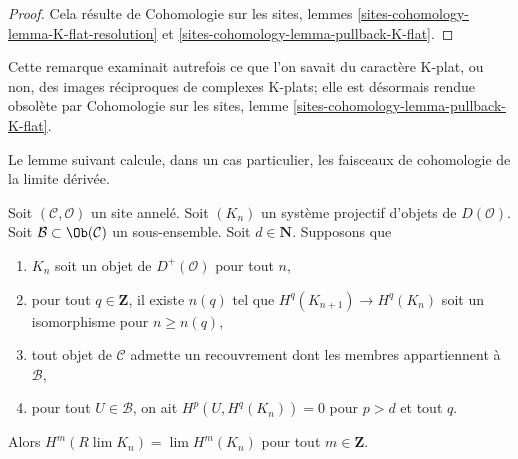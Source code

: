 \begin{proof}
Cela résulte de Cohomologie sur les sites, lemmes
\ref{sites-cohomology-lemma-K-flat-resolution} et
\ref{sites-cohomology-lemma-pullback-K-flat}.
\end{proof}

\begin{remark}
\label{remark-pullback-K-flat}
Cette remarque examinait autrefois ce que l'on savait du caractère K-plat,
ou non, des images réciproques de complexes K-plats; elle est désormais
rendue obsolète par Cohomologie sur les sites, lemme
\ref{sites-cohomology-lemma-pullback-K-flat}.
\end{remark}

\noindent
Le lemme suivant calcule, dans un cas particulier, les faisceaux de
cohomologie de la limite dérivée.

\begin{lemma}
\label{lemma-Rlim-of-system}
Soit $(\mathcal{C}, \mathcal{O})$ un site annelé. Soit $(K_n)$
un système projectif d'objets de $D(\mathcal{O})$.
Soit $\mathcal{B} \subset \Ob(\mathcal{C})$ un sous-ensemble.
Soit $d \in \mathbf{N}$. Supposons que
\begin{enumerate}
\item $K_n$ soit un objet de $D^+(\mathcal{O})$ pour tout $n$,
\item pour tout $q \in \mathbf{Z}$, il existe
$n(q)$ tel que $H^q(K_{n + 1}) \to H^q(K_n)$ soit un isomorphisme pour
$n \geq n(q)$,
\item tout objet de $\mathcal{C}$ admette un recouvrement dont les membres
appartiennent à $\mathcal{B}$,
\item pour tout $U \in \mathcal{B}$, on ait $H^p(U, H^q(K_n)) = 0$
pour $p > d$ et tout $q$.
\end{enumerate}
Alors $H^m(R\lim K_n) = \lim H^m(K_n)$ pour tout $m \in \mathbf{Z}$.
\end{lemma}


